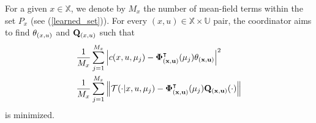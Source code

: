 \documentclass[twoside,11pt]{article}
\begin{document}
 
 For a given $x\in\mathds{X}$, we denote by $M_x$ the number of mean-field terms within the set $P_x$ (see (\ref{learned_set})). 
 For every $(x,u)\in\mathds{X}\times\mathds{U}$ pair, the coordinator aims to find ${\bf \theta}_{(x,u)}$ and ${\bf Q}_{(x,u)}$ such that 
\begin{align*}
&\frac{1}{M_x}\sum_{j=1}^{M_x}\left| c(x,u,\mu_j) - {\bf \Phi^\intercal_{(x,u)}}(\mu_j) {\bf \theta_{(x,u)}}\right|^2\\
&\frac{1}{M_x}\sum_{j=1}^{M_x}\left\| \mathcal{T}(\cdot |x,u,\mu_j) - {\bf \Phi^\intercal_{(x,u)}}(\mu_j) {\bf Q_{(x,u)}(\cdot)}\right\|
\end{align*}
is minimized.


\end{document}
